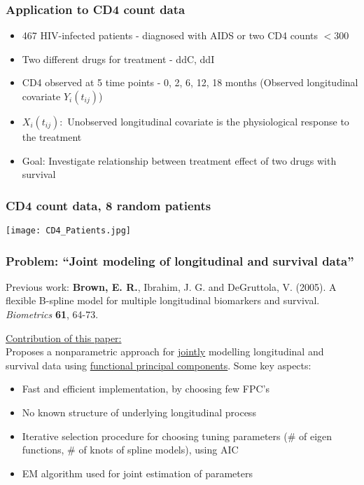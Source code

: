 \documentclass[10pt,dvipsnames,table, handout]{beamer} %
\begin{document}
\begin{frame}
\frametitle{Application to CD4 count data}
\begin{itemize}
\item 467 HIV-infected patients - diagnosed with AIDS or two CD4 counts $< 300$
\item Two different drugs for treatment - ddC, ddI
\item CD4 observed at 5 time points - 0, 2, 6, 12, 18 months (Observed longitudinal covariate $Y_{i}(t_{ij})$)
\item $X_{i}(t_{ij}): $ Unobserved longitudinal covariate is the physiological response to the treatment
\item Goal: Investigate relationship between treatment effect of two drugs with survival
\end{itemize}
\end{frame}

\begin{frame}
\frametitle{CD4 count data, 8 random patients}
\begin{center}
\texttt{[image: CD4\_Patients.jpg]} \\
\end{center}
\end{frame}

\begin{frame}
\frametitle{Problem: ``Joint modeling of longitudinal and survival data''}
Previous work: {\bf{Brown, E. R.}}, Ibrahim, J. G. and DeGruttola, V. (2005). A flexible B-spline model for multiple
longitudinal biomarkers and survival. {\emph{Biometrics}} {\bf{61}}, 64-73. \\
\pause

{\underline{Contribution of this paper:}} \\
Proposes a nonparametric approach for {\underline{jointly}} modelling longitudinal and survival data using {\underline{functional principal components}}. Some key aspects:\\
\begin{itemize}
\item Fast and efficient implementation, by choosing few FPC's
\item No known structure of underlying longitudinal process
\item Iterative selection procedure for choosing tuning parameters (\# of eigen functions, \# of knots of spline models), using AIC 
\item EM algorithm used for joint estimation of parameters
\end{itemize}
\end{frame}
\end{document}
